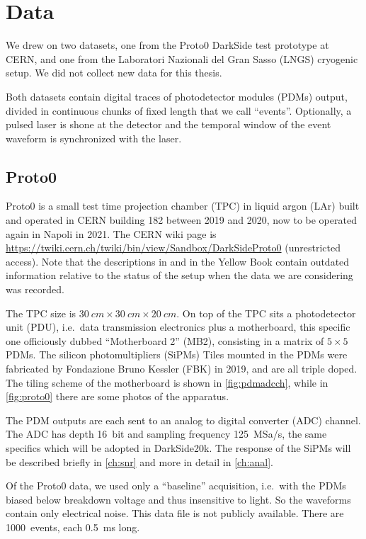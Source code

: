 \chapter{Data}
\label{ch:data}

We drew on two datasets, one from the Proto0 DarkSide test prototype at CERN,
and one from the Laboratori Nazionali del Gran Sasso (LNGS) cryogenic setup.
We did not collect new data for this thesis.

Both datasets contain digital traces of photodetector modules (PDMs) output,
divided in continuous chunks of fixed length that we call ``events''.
Optionally, a pulsed laser is shone at the detector and the temporal window of
the event waveform is synchronized with the laser.

\section{Proto0}

Proto0 is a small test time projection chamber (TPC) in liquid argon (LAr)
built and operated in CERN building 182 between 2019 and 2020, now to be
operated again in Napoli in 2021. The CERN wiki page is
\url{https://twiki.cern.ch/twiki/bin/view/Sandbox/DarkSideProto0} (unrestricted
access). Note that the descriptions in \cite[sec.~4.3.2]{luzzi2020} and in the
Yellow Book \cite[65]{aalseth2018} contain outdated information relative to the
status of the setup when the data we are considering was recorded.

The TPC size is $\SI{30}{cm} \times \SI{30}{cm} \times \SI{20}{cm}$. On top of
the TPC sits a photodetector unit (PDU), i.e.\ data transmission electronics
plus a motherboard, this specific one officiously dubbed ``Motherboard 2''
(MB2), consisting in a matrix of $5\times 5$ PDMs. The silicon photomultipliers
(SiPMs) Tiles mounted in the PDMs were fabricated by Fondazione Bruno Kessler
(FBK) in 2019, and are all triple doped. The tiling scheme of the motherboard
is shown in \autoref{fig:pdmadcch}, while in \autoref{fig:proto0} there are
some photos of the apparatus.

The PDM outputs are each sent to an analog to digital converter (ADC) channel.
The ADC has depth \SI{16}{bit} and sampling frequency \SI{125}{MSa/s}, the same
specifics which will be adopted in DarkSide20k. The response of the SiPMs will
be described briefly in \autoref{ch:snr} and more in detail in
\autoref{ch:anal}.

Of the Proto0 data, we used only a ``baseline'' acquisition, i.e.\ with the
PDMs biased below breakdown voltage and thus insensitive to light. So the
waveforms contain only electrical noise. This data file is not publicly
available. There are 1000~events, each \SI{0.5}{ms} long.

